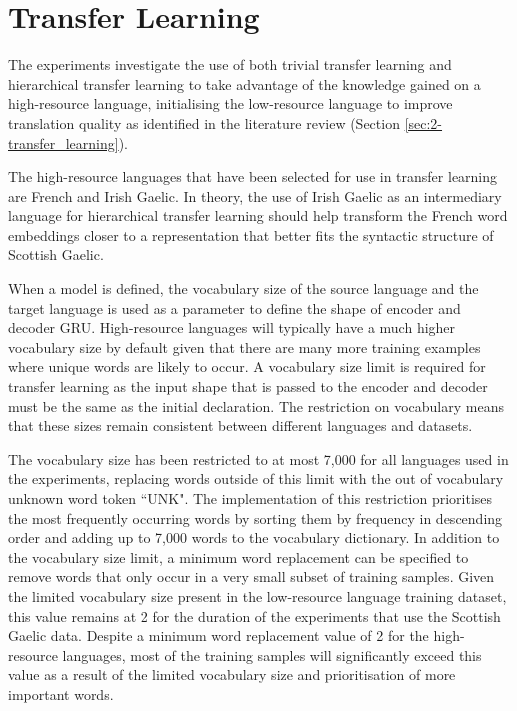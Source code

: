 \section{Transfer Learning}
\label{sec:3-transfer_learning}

The experiments investigate the use of both trivial transfer learning and hierarchical transfer learning to take advantage of the knowledge gained on a high-resource language, initialising the low-resource language to improve translation quality as identified in the literature review (Section \ref{sec:2-transfer_learning}).

The high-resource languages that have been selected for use in transfer learning are French and Irish Gaelic. In theory, the use of Irish Gaelic as an intermediary language for hierarchical transfer learning should help transform the French word embeddings closer to a representation that better fits the syntactic structure of Scottish Gaelic.


When a model is defined, the vocabulary size of the source language and the target language is used as a parameter to define the shape of encoder and decoder \acrshort{GRU}. High-resource languages will typically have a much higher vocabulary size by default given that there are many more training examples where unique words are likely to occur. A vocabulary size limit is required for transfer learning as the input shape that is passed to the encoder and decoder must be the same as the initial declaration. The restriction on vocabulary means that these sizes remain consistent between different languages and datasets.

The vocabulary size has been restricted to at most 7,000 for all languages used in the experiments, replacing words outside of this limit with the out of vocabulary unknown word token ``UNK". The implementation of this restriction prioritises the most frequently occurring words by sorting them by frequency in descending order and adding up to 7,000 words to the vocabulary dictionary.
In addition to the vocabulary size limit, a minimum word replacement can be specified to remove words that only occur in a very small subset of training samples. Given the limited vocabulary size present in the low-resource language training dataset, this value remains at 2 for the duration of the experiments that use the Scottish Gaelic data. Despite a minimum word replacement value of 2 for the high-resource languages, most of the training samples will significantly exceed this value as a result of the limited vocabulary size and prioritisation of more important words.

